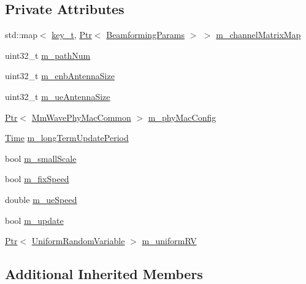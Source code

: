 \subsection*{Private Attributes}
\begin{DoxyCompactItemize}
\item 
std\+::map$<$ \hyperlink{namespacens3_aa42bd408e172586b3b192acfaa36b070}{key\+\_\+t}, \hyperlink{classns3_1_1Ptr}{Ptr}$<$ \hyperlink{structns3_1_1BeamformingParams}{Beamforming\+Params} $>$ $>$ \hyperlink{classns3_1_1MmWaveBeamforming_a934e34478d7bb32f34ed64ef2e66728b}{m\+\_\+channel\+Matrix\+Map}
\item 
uint32\+\_\+t \hyperlink{classns3_1_1MmWaveBeamforming_a4aeb1eea76b6ba2be91c411494b4c573}{m\+\_\+path\+Num}
\item 
uint32\+\_\+t \hyperlink{classns3_1_1MmWaveBeamforming_afd76d851ee841afc56c0f8b7563e2bbc}{m\+\_\+enb\+Antenna\+Size}
\item 
uint32\+\_\+t \hyperlink{classns3_1_1MmWaveBeamforming_a1debaf83bab520b89e80f333841dfe93}{m\+\_\+ue\+Antenna\+Size}
\item 
\hyperlink{classns3_1_1Ptr}{Ptr}$<$ \hyperlink{classns3_1_1MmWavePhyMacCommon}{Mm\+Wave\+Phy\+Mac\+Common} $>$ \hyperlink{classns3_1_1MmWaveBeamforming_a8984cd1f9d9597c3b555bfa98daad906}{m\+\_\+phy\+Mac\+Config}
\item 
\hyperlink{classns3_1_1Time}{Time} \hyperlink{classns3_1_1MmWaveBeamforming_acdc1c52dae96b7e5b73a235f381e39f0}{m\+\_\+long\+Term\+Update\+Period}
\item 
bool \hyperlink{classns3_1_1MmWaveBeamforming_a08a07e3ded70f591331ecb9f88482220}{m\+\_\+small\+Scale}
\item 
bool \hyperlink{classns3_1_1MmWaveBeamforming_aa083011423cd8a3c1077725af8bb7de0}{m\+\_\+fix\+Speed}
\item 
double \hyperlink{classns3_1_1MmWaveBeamforming_a11796c9c9b2df2d24fe99e7e5817cd20}{m\+\_\+ue\+Speed}
\item 
bool \hyperlink{classns3_1_1MmWaveBeamforming_abb587108615acddd1438879730658dad}{m\+\_\+update}
\item 
\hyperlink{classns3_1_1Ptr}{Ptr}$<$ \hyperlink{classns3_1_1UniformRandomVariable}{Uniform\+Random\+Variable} $>$ \hyperlink{classns3_1_1MmWaveBeamforming_acde578460be1bc261748dde89e1a9cc4}{m\+\_\+uniform\+RV}
\end{DoxyCompactItemize}
\subsection*{Additional Inherited Members}


